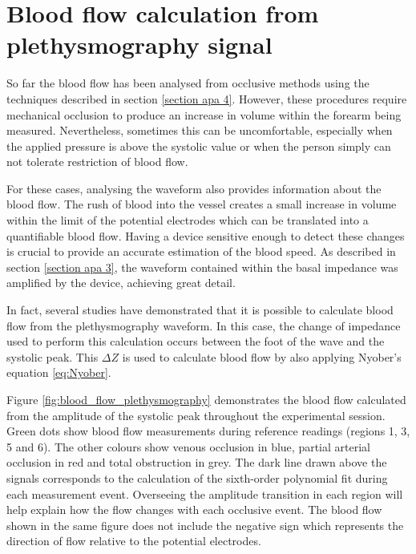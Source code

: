 \section{Blood flow calculation from plethysmography signal}
\label{section apa 5}
So far the blood flow has been analysed from occlusive methods using the techniques described in section \ref{section apa 4}. However, these procedures require mechanical occlusion to produce an increase in volume within the forearm being measured. Nevertheless, sometimes this can be uncomfortable, especially when the applied pressure is above the systolic value or when the person simply can not tolerate restriction of blood flow.

For these cases, analysing the waveform also provides information about the blood flow.  The rush of blood into the vessel creates a small increase in volume within the limit of the potential electrodes which can be translated into a quantifiable blood flow. Having a device sensitive enough to detect these changes is crucial to provide an accurate estimation of the blood speed. As described in section \ref{section apa 3}, the waveform contained within the basal impedance was amplified by the device, achieving great detail. 

In fact, several studies  have demonstrated that it is possible to calculate blood flow from the plethysmography waveform. In this case, the change of impedance used to perform this calculation occurs between the foot of the wave and the systolic peak. This $\Delta Z$ is used to calculate blood flow by also applying Nyober's equation \ref{eq:Nyober}. 

Figure \ref{fig:blood_flow_plethysmography} demonstrates the blood flow calculated from the amplitude of the systolic peak throughout the experimental session. Green dots show blood flow measurements during reference readings (regions 1, 3, 5 and 6). The other colours show venous occlusion in blue, partial arterial occlusion in red and total obstruction in grey. The dark line drawn above the signals corresponds to the calculation of the sixth-order polynomial fit during each measurement event. Overseeing the amplitude transition in each region will help explain how the flow changes with each occlusive event. The blood flow shown in the same figure does not include the negative sign which represents the direction of flow relative to the potential electrodes.

